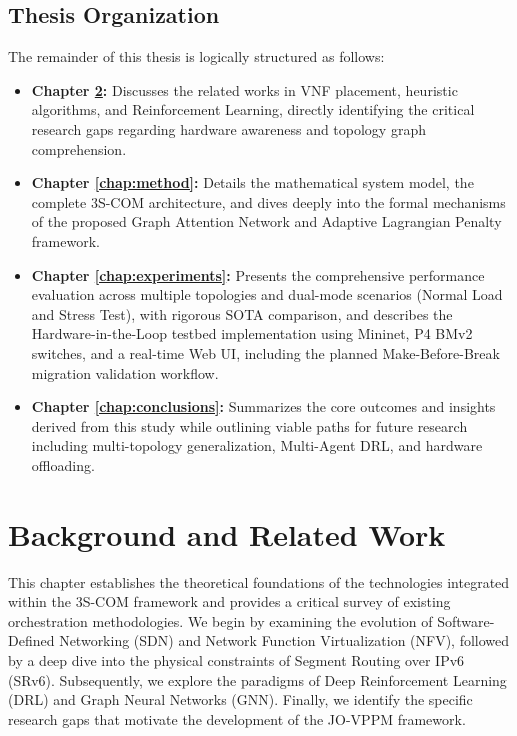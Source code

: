 \documentclass[12pt, a4paper, reqno, oneside]{book}
\begin{document}
\section{Thesis Organization}
The remainder of this thesis is logically structured as follows:
\begin{itemize}
    \item \textbf{Chapter \ref{chap:background_related}:} Discusses the related works in VNF placement, heuristic algorithms, and Reinforcement Learning, directly identifying the critical research gaps regarding hardware awareness and topology graph comprehension.
    \item \textbf{Chapter \ref{chap:method}:} Details the mathematical system model, the complete 3S-COM architecture, and dives deeply into the formal mechanisms of the proposed Graph Attention Network and Adaptive Lagrangian Penalty framework.
    \item \textbf{Chapter \ref{chap:experiments}:} Presents the comprehensive performance evaluation across multiple topologies and dual-mode scenarios (Normal Load and Stress Test), with rigorous SOTA comparison, and describes the Hardware-in-the-Loop testbed implementation using Mininet, P4 BMv2 switches, and a real-time Web UI, including the planned Make-Before-Break migration validation workflow.
    \item \textbf{Chapter \ref{chap:conclusions}:} Summarizes the core outcomes and insights derived from this study while outlining viable paths for future research including multi-topology generalization, Multi-Agent DRL, and hardware offloading.
\end{itemize}

\chapter{Background and Related Work}
\label{chap:background_related}

This chapter establishes the theoretical foundations of the technologies integrated within the 3S-COM framework and provides a critical survey of existing orchestration methodologies. We begin by examining the evolution of Software-Defined Networking (SDN) and Network Function Virtualization (NFV), followed by a deep dive into the physical constraints of Segment Routing over IPv6 (SRv6). Subsequently, we explore the paradigms of Deep Reinforcement Learning (DRL) and Graph Neural Networks (GNN). Finally, we identify the specific research gaps that motivate the development of the JO-VPPM framework.
\end{document}
